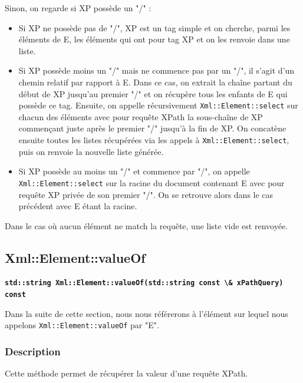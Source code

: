     Sinon, on regarde si XP possède un "/" :
    \begin{itemize}
        \item Si XP ne possède pas de "/", XP est un tag simple et on cherche, parmi les éléments de E, les éléments qui ont pour tag XP et on les renvoie dans une liste.
        \item Si XP possède moins un "/" mais ne commence pas par un "/", il s'agit d'un chemin relatif par rapport à E. Dans ce cas, on extrait la chaîne partant du début de XP jusqu'au premier "/" et on récupère tous les enfants de E qui possède ce tag. Ensuite, on appelle récursivement \lstinline$Xml::Element::select$ sur chacun des éléments avec pour requête XPath la sous-chaîne de XP commençant juste après le premier "/" jusqu'à la fin de XP. On concatène ensuite toutes les listes récupérées via les appels à \lstinline$Xml::Element::select$, puis on renvoie la nouvelle liste générée.
        \item Si XP possède au moins un "/" et commence par "/", on appelle \lstinline$Xml::Element::select$ sur la racine du document contenant E avec pour requête XP privée de son premier "/". On se retrouve alors dans le cas précédent avec E étant la racine.
        \\
    \end{itemize}

    Dans le cas où aucun élément ne match la requête, une liste vide est renvoyée.

    \subsection{Xml::Element::valueOf}

    \textbf{\lstinline$std::string Xml::Element::valueOf(std::string const \& xPathQuery) const$}

    Dans la suite de cette section, nous nous référerons à l'élément sur lequel nous appelons \lstinline$Xml::Element::valueOf$ par "E".

    \subsubsection{Description}
    Cette méthode permet de récupérer la valeur d'une requête XPath.

